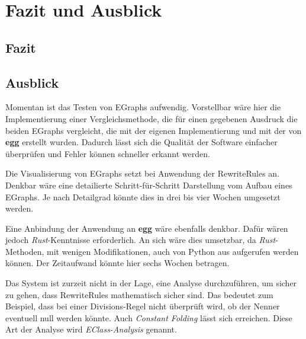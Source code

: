 \section{Fazit und Ausblick}\label{sec:fazit}

\subsection{Fazit}

\subsection{Ausblick}

Momentan ist das Testen von EGraphs aufwendig. Vorstellbar wäre hier die Implementierung einer Vergleichsmethode, die für einen gegebenen Ausdruck die beiden EGraphs vergleicht,
die mit der eigenen Implementierung und mit der von \textbf{egg} erstellt wurden. Dadurch lässt sich die Qualität der Software einfacher überprüfen und Fehler können schneller
erkannt werden.

\noindent Die Visualisierung von EGraphs setzt bei Anwendung der RewriteRules an. Denkbar wäre eine detailierte Schritt-für-Schritt Darstellung vom Aufbau eines EGraphs.
Je nach Detailgrad könnte dies in drei bis vier Wochen umgesetzt werden.

\noindent Eine Anbindung der Anwendung an \textbf{egg} wäre ebenfalls denkbar. Dafür wären jedoch \textit{Rust}-Kenntnisse erforderlich. An sich wäre dies umsetzbar, da 
\textit{Rust}-Methoden, mit wenigen Modifikationen, auch von Python aus aufgerufen werden können.
Der Zeitaufwand könnte hier sechs Wochen betragen.

\noindent Das System ist zurzeit nicht in der Lage, eine Analyse durchzuführen, um sicher zu gehen, dass RewriteRules mathematisch sicher sind. Das bedeutet zum Beispiel, dass 
bei einer Divisions-Regel nicht überprüft wird, ob der Nenner eventuell null werden könnte. 
Auch \textit{Constant Folding} lässt sich erreichen.
Diese Art der Analyse wird \textit{EClass-Analysis} genannt.  